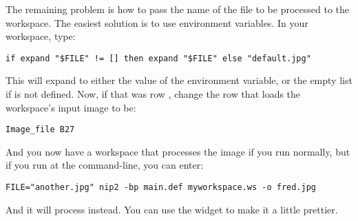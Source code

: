 The remaining problem is how to pass the name of the file to be processed to
the workspace. The easiest solution is to use environment variables. In your
workspace, type:

\begin{verbatim}
if expand "$FILE" != [] then expand "$FILE" else "default.jpg"
\end{verbatim}

\noindent
This will expand to either the value of the  environment variable,
or the empty list if  is not defined. Now, if that was row
, change the row that loads the workspace's input image to be:

\begin{verbatim}
Image_file B27
\end{verbatim}

\noindent
And you now have a workspace that processes the image  if you
run \nip{} normally, but if you run at the command-line, you can enter:

\begin{verbatim}
FILE="another.jpg" nip2 -bp main.def myworkspace.ws -o fred.jpg
\end{verbatim}

\noindent
And it will process  instead. You can use the
 widget to make it a little prettier.

